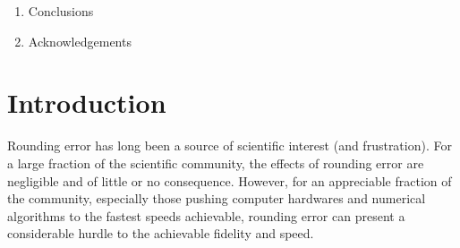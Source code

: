 \documentclass[manuscript,review]{acmart}
\begin{document}
{\begin{enumerate}
\begin{enumerate}
\item The expected time savings. 
\item The variance reductions from simulations
\item The applicability of half precision and Kahan summation version. 
\item Can I get some C timings for path simulations using (savings from wider vectorisation and also lower precision calculations), using piecewise linear approximation with unions, or the LUT:
\begin{enumerate}
\item Double precision 
\item Single precision 
\item Half precision
\item Half precision with Kahan summation. 
\item Possibly both for the Euler and Milstein and GBM processes. 
\end{enumerate}
\item Calculate expected time savings. 
\end{enumerate}
\item Conclusions
\item Acknowledgements 
\end{enumerate}
}
\clearpage

\section{Introduction}
\label{sec:introduction}

Rounding error has long been a source of scientific interest (and frustration). For a large fraction of the scientific community, the effects of rounding error are negligible and of little or no consequence. However, for an appreciable fraction of the community, especially those pushing computer hardwares and numerical algorithms to the fastest speeds achievable, rounding error can present a considerable hurdle to the achievable fidelity and speed.
\end{document}
